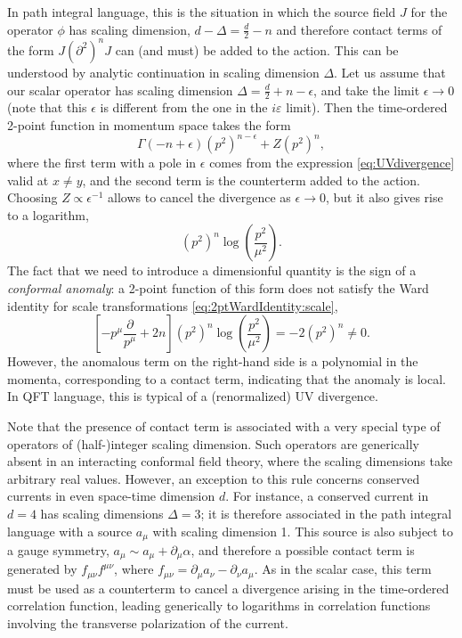 \documentclass[a4paper,12pt]{article}
\numberwithin{equation}{section}
\begin{document}
In path integral language, this is the situation in which the source field $J$ for the operator $\phi$ has scaling dimension, $d - \Delta = \frac{d}{2} - n$ and therefore contact terms of the form $J (\partial^2)^n J$ can (and must) be added to the action. This can be understood by analytic continuation in scaling dimension $\Delta$. Let us assume that our scalar operator has scaling dimension $\Delta = \frac{d}{2} + n - \epsilon$, and take the limit $\epsilon \to 0$ (note that this $\epsilon$ is different from the one in the $i \varepsilon$ limit). Then the time-ordered 2-point function in momentum space takes the form
\begin{equation}
	\Gamma(-n + \epsilon) (p^2)^{n - \epsilon}
	+ Z (p^2)^n,
\end{equation}
where the first term with a pole in $\epsilon$ comes from the expression \eqref{eq:UVdivergence} valid at $x \neq y$, and the second term is the counterterm added to the action.
Choosing $Z \propto \epsilon^{-1}$ allows to cancel the divergence as $\epsilon \to 0$, but it also gives rise to a logarithm, 
\begin{equation}
	(p^2)^n \log\left( \frac{p^2}{\mu^2} \right).
\end{equation}
The fact that we need to introduce a dimensionful quantity is the sign of a \emph{conformal anomaly}: a 2-point function of this form does not  satisfy the Ward identity for scale transformations \eqref{eq:2ptWardIdentity:scale},
\begin{equation}
	\left[ -p^\mu \frac{\partial}{p^\mu} + 2n \right]
	(p^2)^n \log\left( \frac{p^2}{\mu^2} \right)
	= -2 (p^2)^n \neq 0.
\end{equation}
However, the anomalous term on the right-hand side is a polynomial in the momenta, corresponding to a contact term, indicating that the anomaly is local. In QFT language, this is typical of a (renormalized) UV divergence.

Note that the presence of contact term is associated with a very special type of operators of (half-)integer scaling dimension. Such operators are generically absent in an interacting conformal field theory, where the scaling dimensions take arbitrary real values. 
However, an exception to this rule concerns conserved currents in even space-time dimension $d$. For instance, a conserved current in $d = 4$ has scaling dimensions $\Delta = 3$; it is therefore associated in the path integral language with a source $a_\mu$ with scaling dimension 1. This source is also subject to a gauge symmetry, $a_\mu \sim a_\mu + \partial_\mu \alpha$, and therefore a possible contact term is generated by $f_{\mu\nu} f^{\mu\nu}$, where $f_{\mu\nu} = \partial_\mu a_\nu - \partial_\nu a_\mu$. As in the scalar case, this term must be used as a counterterm to cancel a divergence arising in the time-ordered correlation function, leading generically to logarithms in correlation functions involving the transverse polarization of the current.
\end{document}
